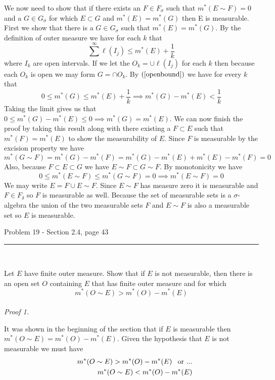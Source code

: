 \documentclass[11pt,reqno]{article}
\begin{document}
We now need to show that if there exists an $F \in F_\sigma$ such that $m^*(E \sim F) = 0$ and a $G \in G_\sigma$ for which $E \subset G$ and $m^*(E) = m^*(G)$ then E is measurable. First we show that there is a $G \in G_\sigma$ such that $m^*(E) = m^*(G)$. By the definition of outer measure we have for each $k$ that
\[ \sum^\infty \ell(I_j) \le m^*(E) + \frac{1}{k} \]
where $I_k$ are open intervals. If we let the $O_k = \cup \ell(I_j)$ for each $k$ then because each $O_k$ is open we may form $G = \cap O_k$. By $(\ref{openbound})$ we have for every $k$ that
\[ 0 \le m^*(G) \le m^*(E) + \frac{1}{k} \implies m^*(G) - m^*(E) < \frac{1}{k} \]
Taking the limit gives us that $0 \le m^*(G) - m^*(E) \le 0 \implies m^*(G) = m^*(E)$. We can now finish the proof by taking this result along with there existing a $F \subset E$ such that $m^*(F) = m^*(E)$ to show the measurability of $E$.
Since $F$ is measurable by the excision property we have
\[ m^*(G \sim F) = m^*(G) - m^*(F) = m^*(G) - m^*(E) + m^*(E) - m^*(F) = 0 \]
Also, because $F \subset E \subset G$ we have $E \sim F \subset G \sim F$. By monotonicity we have 
\[ 0 \le m^*(E \sim F) \le m^*(G \sim F) = 0  \implies m^*(E \sim F) = 0\] 
We may write $E = F \cup E \sim F$. Since $E \sim F$ has measure zero it is measurable and $F \in F_\delta$ so $F$ is measurable as well. Because the set of measurable sets is a $\sigma$-algebra the union of the two measurable sets $F$ and $E \sim F$ is also a measurable set so $E$ is measurable.

\begin{flushleft} 
Problem 19 - Section 2.4, page 43\\
\rule{500pt}{1pt}\\
\end{flushleft} 

Let $E$ have finite outer measure. Show that if $E$ is not measurable, then there is an open set $O$ containing $E$ that has finite outer measure and for which 
\[ m^*(O \sim E) > m^*(O) - m^*(E) \]
\\ \emph{Proof 1.}

It was shown in the beginning of the section that if $E$ is measurable then $m^*(O \sim E) = m^*(O) - m^*(E)$. Given the hypothesis that $E$ is not measurable we must have
\begin{eqnarray}
&&m^*(O \sim E) > m^*(O) - m^*(E) \hspace{8px} \text{or ...} \label{measurediffgreat}\\
&&m^*(O \sim E) < m^*(O) - m^*(E) \label{measurediffless}
\end{eqnarray}
\end{document}
